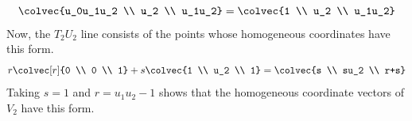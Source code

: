 \begin{exercises}
\begin{answer}
\begin{exparts}
\begin{equation*}
             \colvec{u_0u_1u_2 \\ u_2 \\ u_1u_2}
             =\colvec{1 \\ u_2 \\ u_1u_2}
           \end{equation*}
           Now, the $T_2U_2$ line consists of the points whose homogeneous 
           coordinates have this form.
           \begin{equation*}
             r\colvec[r]{0 \\ 0 \\ 1}+s\colvec{1 \\ u_2 \\ 1}
             =\colvec{s \\ su_2 \\ r+s}
           \end{equation*}
           Taking $s=1$ and $r=u_1u_2-1$ shows that the
           homogeneous coordinate vectors of $V_2$ have this form.
      \end{exparts}
    \end{answer}
\end{exercises}
\endinput
